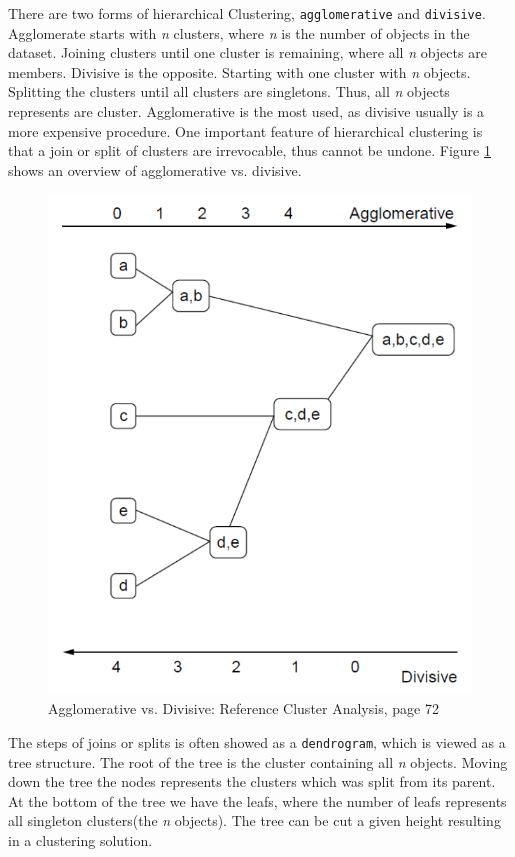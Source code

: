 \documentclass[a4paper,10pt]{article}
\theoremstyle{plain}
\theoremstyle{definition}
\begin{document}
There are two forms of hierarchical Clustering, \texttt{agglomerative} and \texttt{divisive}. Agglomerate starts with \textit{n} clusters, where \textit{n} is the number of objects in the dataset. Joining clusters until one cluster is remaining, where all \textit{n} objects are members. Divisive is the opposite. Starting with one cluster with \textit{n} objects. Splitting the clusters until all clusters are singletons. Thus, all \textit{n} objects represents are cluster. Agglomerative is the most used, as divisive usually is a more expensive procedure. One important feature of hierarchical clustering is that a join or split of clusters are irrevocable, thus cannot be undone. Figure \ref{fig:agglo_vs_div} shows an overview of agglomerative vs. divisive.
\begin{figure}[H]
	\centering
	\includegraphics*[scale=0.3]{./pictures/hc/agglo_vs_div.png}
	\caption{Agglomerative vs. Divisive: Reference Cluster Analysis, page 72}
	\label{fig:agglo_vs_div}
\end{figure} 
The steps of joins or splits is often showed as a \texttt{dendrogram}, which is viewed as a tree structure. The root of the tree is the cluster containing all \textit{n} objects. Moving down the tree the nodes represents the clusters which was split from its parent. At the bottom of the tree we have the leafs, where the number of leafs represents all singleton clusters(the \textit{n} objects). The tree can be cut a given height resulting in a clustering solution. 
\end{document}
